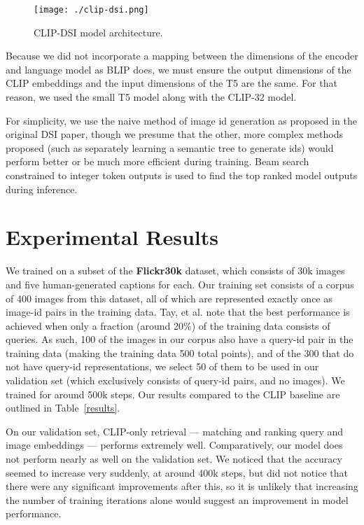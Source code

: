 \documentclass[11pt,a4paper]{article}
\begin{document}
\begin{figure*}[tp]
    \centering
    \texttt{[image: ./clip-dsi.png]}
    \caption{CLIP-DSI model architecture.}
    \label{fig:model}
\end{figure*}

Because we did not incorporate a mapping between the dimensions of the encoder and language model as BLIP does, we must ensure the output dimensions of the CLIP embeddings and the input dimensions of the T5 are the same. For that reason, we used the small T5 model along with the CLIP-32 model.

For simplicity, we use the naive method of image id generation as proposed in the original DSI paper, though we presume that the other, more complex methods proposed (such as separately learning a semantic tree to generate ids) would perform better or be much more efficient during training. Beam search constrained to integer token outputs is used to find the top ranked model outputs during inference.

\section*{Experimental Results}

We trained on a subset of the \textbf{Flickr30k} dataset, which consists of 30k images and five human-generated captions for each. Our training set consists of a corpus of 400 images from this dataset, all of which are represented exactly once as image-id pairs in the training data. Tay, et al. note that the best performance is achieved when only a fraction (around 20\%) of the training data consists of queries. As such, 100 of the images in our corpus also have a query-id pair in the training data (making the training data 500 total points), and of the 300 that do not have query-id representations, we select 50 of them to be used in our validation set (which exclusively consists of query-id pairs, and no images). We trained for around 500k steps. Our results compared to the CLIP baseline are outlined in Table~\ref{results}. 

On our validation set, CLIP-only retrieval — matching and ranking query and image embeddings — performs extremely well. Comparatively, our model does not perform nearly as well on the validation set. We noticed that the accuracy seemed to increase very suddenly, at around 400k steps, but did not notice that there were any significant improvements after this, so it is unlikely that increasing the number of training iterations alone would suggest an improvement in model performance.
\end{document}
